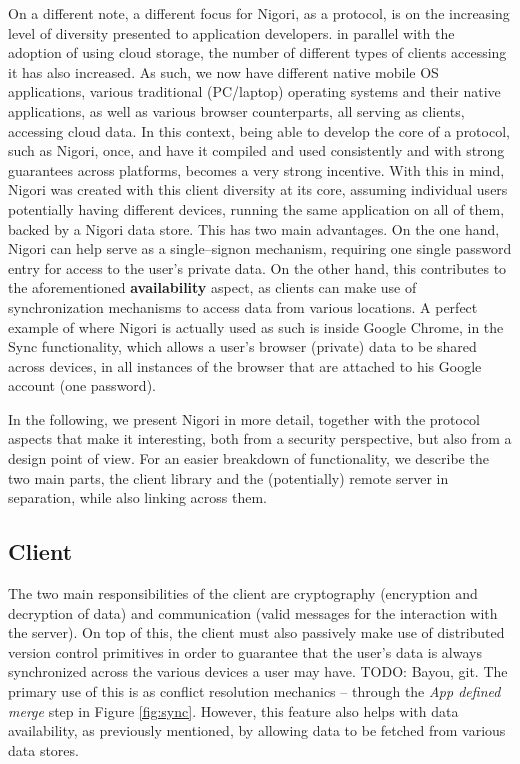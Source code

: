 On a different note, a different focus for Nigori, as a protocol, is on the increasing level of diversity presented to application developers.
in parallel with the adoption of using cloud storage, the number of different types of clients accessing it has also increased.
As such, we now have different native mobile OS applications, various traditional (PC/laptop) operating systems and their native applications, as well as various browser counterparts, all serving as clients, accessing cloud data.
In this context, being able to develop the core of a protocol, such as Nigori, once, and have it compiled and used consistently and with strong guarantees across platforms, becomes a very strong incentive.
With this in mind, Nigori was created with this client diversity at its core, assuming individual users potentially having different devices, running the same application on all of them, backed by a Nigori data store.
This has two main advantages.
On the one hand, Nigori can help serve as a single--signon mechanism, requiring one single password entry for access to the user's private data.
On the other hand, this contributes to the aforementioned \textbf{availability} aspect, as clients can make use of synchronization mechanisms to access data from various locations.
A perfect example of where Nigori is actually used as such is inside Google Chrome, in the Sync functionality, which allows a user's browser (private) data to be shared across devices, in all instances of the browser that are attached to his Google account (one password).

In the following, we present Nigori in more detail, together with the protocol aspects that make it interesting, both from a security perspective, but also from a design point of view.
For an easier breakdown of functionality, we describe the two main parts, the client library and the (potentially) remote server in separation, while also linking across them.

\subsection{Client}
The two main responsibilities of the client are cryptography (encryption and decryption of data) and communication (valid messages for the interaction with the server).
On top of this, the client must also passively make use of distributed version control primitives in order to guarantee that the user's data is always synchronized across the various devices a user may have.
TODO: Bayou, git.
The primary use of this is as conflict resolution mechanics -- through the \textit{App defined merge} step in Figure \ref{fig:sync}.
However, this feature also helps with data availability, as previously mentioned, by allowing data to be fetched from various data stores.

